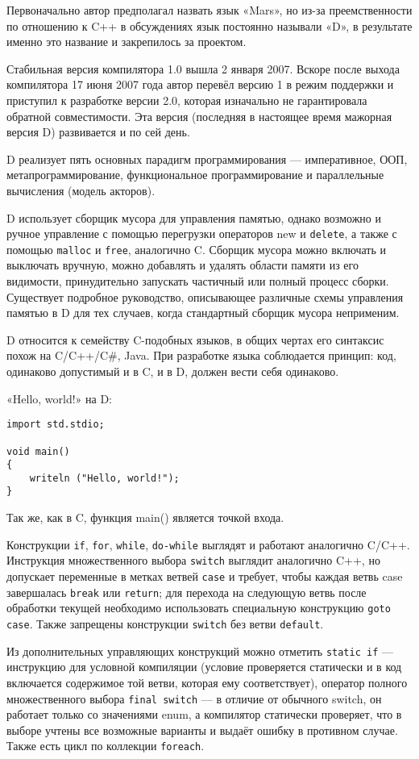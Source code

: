 \documentclass[732]{studrep}
\begin{document}
Первоначально автор предполагал назвать язык «Mars», но из-за преемственности по отношению к C++ в обсуждениях язык постоянно называли «D», в результате именно это название и закрепилось за проектом.

Стабильная версия компилятора 1.0 вышла 2 января 2007. Вскоре после выхода компилятора 17 июня 2007 года автор перевёл версию 1 в режим поддержки и приступил к разработке версии 2.0, которая изначально не гарантировала обратной совместимости. Эта версия (последняя в настоящее время мажорная версия D) развивается и по сей день.

D реализует пять основных парадигм программирования — императивное, ООП, метапрограммирование, функциональное программирование и параллельные вычисления (модель акторов).

D использует сборщик мусора для управления памятью, однако возможно и ручное управление с помощью перегрузки операторов new и \texttt{delete}, а также с помощью \texttt{malloc} и \texttt{free}, аналогично C. Сборщик мусора можно включать и выключать вручную, можно добавлять и удалять области памяти из его видимости, принудительно запускать частичный или полный процесс сборки. Существует подробное руководство, описывающее различные схемы управления памятью в D для тех случаев, когда стандартный сборщик мусора неприменим.

D относится к семейству C-подобных языков, в общих чертах его синтаксис похож на C/C++/C\#, Java. При разработке языка соблюдается принцип: код, одинаково допустимый и в C, и в D, должен вести себя одинаково.

«Hello, world!» на D:
\begin{verbatim}
import std.stdio;

void main()
{
    writeln ("Hello, world!");
}
\end{verbatim}
Так же, как в C, функция main() является точкой входа.

Конструкции \texttt{if}, \texttt{for}, \texttt{while}, \texttt{do-while} выглядят и работают аналогично C/C++. Инструкция множественного выбора \texttt{switch} выглядит аналогично C++, но допускает переменные в метках ветвей \texttt{case} и требует, чтобы каждая ветвь case завершалась \texttt{break} или \texttt{return}; для перехода на следующую ветвь после обработки текущей необходимо использовать специальную конструкцию \texttt{goto case}. Также запрещены конструкции \texttt{switch} без ветви \texttt{default}.

Из дополнительных управляющих конструкций можно отметить \texttt{static if} — инструкцию для условной компиляции (условие проверяется статически и в код включается содержимое той ветви, которая ему соответствует), оператор полного множественного выбора \texttt{final switch} — в отличие от обычного switch, он работает только со значениями enum, а компилятор статически проверяет, что в выборе учтены все возможные варианты и выдаёт ошибку в противном случае. Также есть цикл по коллекции \texttt{foreach}.
\end{document}
